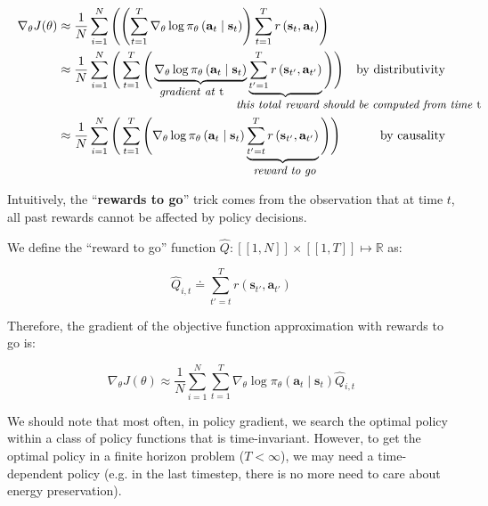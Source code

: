 \documentclass{article}
\begin{document}
\begin{subequations}
  \begin{align}
    \nabla_\theta J(\theta) 
        &\approx \frac{1}{N} \sum_{i=1}^N\left(\left(\sum_{t=1}^T\nabla_\theta\log\pi_\theta\left(\mathbf{a}_t\mid \mathbf{s}_t\right)\right) \sum_{t=1}^T r\left(\mathbf{s}_t,\mathbf{a}_t\right)\right)\\
        &\approx \frac{1}{N} \sum_{i=1}^N\Bigg(\sum_{t=1}^T\Bigg(\underbrace{\nabla_\theta\log\pi_\theta\left(\mathbf{a}_t\mid \mathbf{s}_t\right)}_{\small\llap{\textit{gradient}}\rlap{\textit{ at }t}} \underbrace{\sum_{t'=1}^T r\left(\mathbf{s}_{t'},\mathbf{a}_{t'}\right)}_{\small\llap{\textit{this total }}\rlap{\textit{reward should be computed from time }t}}\Bigg)\Bigg) &\text{by distributivity}\\
        &\approx \frac{1}{N} \sum_{i=1}^N\Bigg(\sum_{t=1}^T\Bigg(\nabla_\theta\log\pi_\theta\left(\mathbf{a}_t\mid \mathbf{s}_t\right) \underbrace{\sum_{t'=t}^T r\left(\mathbf{s}_{t'},\mathbf{a}_{t'}\right)}_{\textit{\small reward to go}}\Bigg)\Bigg) &\text{by causality}
  \end{align}
\end{subequations}

Intuitively, the ``\textbf{rewards to go}'' trick comes from the observation that at time $t$, all past rewards cannot be affected by policy decisions.

We define the ``reward to go'' function $\hat{Q}: \left[\!\left[1,N\right]\!\right] \times \left[\!\left[1,T\right]\!\right] \mapsto \mathbb{R}$ as:

\begin{equation}
  \hat{Q}_{i,t} \doteq \sum_{t'=t}^T r\left(\mathbf{s}_{t'},\mathbf{a}_{t'}\right)
\end{equation}

Therefore, the gradient of the objective function approximation with rewards to go is:

\begin{equation}
  \nabla_\theta J(\theta) \approx \frac{1}{N} \sum_{i=1}^N\sum_{t=1}^T\nabla_\theta\log\pi_\theta\left(\mathbf{a}_t\mid \mathbf{s}_t\right) \hat{Q}_{i,t}
\end{equation}

We should note that most often, in policy gradient, we search the optimal policy within a class of policy functions that is time-invariant. However, to get the optimal policy in a finite horizon problem ($T < \infty$), we may need a time-dependent policy (e.g. in the last timestep, there is no more need to care about energy preservation).
\end{document}
